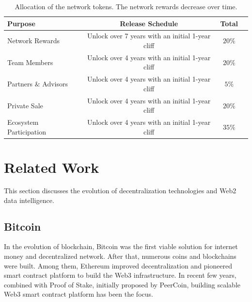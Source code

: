\documentclass[11pt,letterpaper]{article}
\begin{document}
\begin{table}[h!]
  \begin{center}
    \begin{tabular}{l S S l}
      \toprule %
      \textbf{Purpose} & \textbf{Release Schedule} & \textbf{Total} \\
      \midrule %
      Network Rewards & Unlock over 7 years with an initial 1-year cliff & $20\%$\\
      Team Members & Unlock over 4 years with an initial 1-year cliff & $20\%$\\
      Partners $\&$ Advisors & Unlock over 4 years with an initial 1-year cliff & $5\%$ \\
      Private Sale  & Unlock over 4 years with an initial 1-year cliff & $20\%$ \\
      Ecosystem Participation  & Unlock over 4 years with an initial 1-year cliff & $35\%$ \\
      \bottomrule %
    \end{tabular}
  \end{center}
  \caption{Allocation of the network tokens. The network rewards decrease over time.}
    \label{table:token-distribution}
\end{table}





\section{Related Work}
This section discusses the evolution of decentralization technologies and Web2 data intelligence. 

\subsection{Bitcoin}
In the evolution of blockchain, Bitcoin was the first viable solution for internet money and decentralized network. After that, numerous coins and blockchains were built. Among them, Ethereum improved decentralization and pioneered smart contract platform to build the Web3 infrastructure. In recent few years, combined with Proof of Stake, initially proposed by PeerCoin, building scalable Web3 smart contract platform has been the focus.
\end{document}
